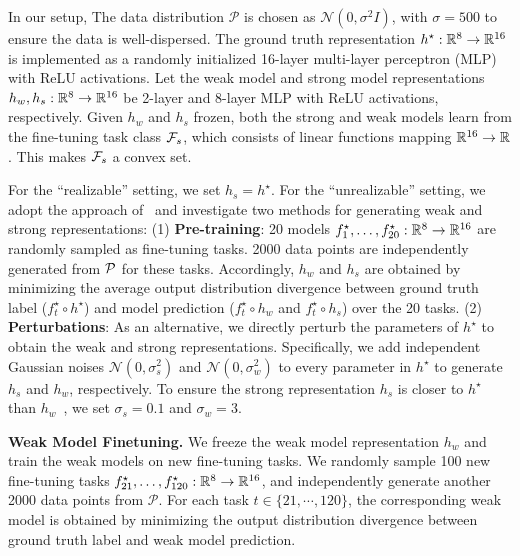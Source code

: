 In our setup, The data distribution $\mathcal{P}$ is chosen as $\mathcal{N}(0, \sigma^2 I)$, with $\sigma=500$ to ensure the data is well-dispersed.
The ground truth representation $h^\star:\mathbb{R}^8 \to \mathbb{R}^{16}$ is implemented as a randomly initialized 16-layer multi-layer perceptron (MLP) with ReLU activations.
Let the weak model and strong model representations $h_w, h_s: \mathbb{R}^8 \to \mathbb{R}^{16}$ be 2-layer and 8-layer MLP with ReLU activations, respectively.
Given $h_w$ and $h_s$ frozen, both the strong and weak models learn from the fine-tuning task class $\mathcal{F}_s$, which consists of linear functions mapping $\mathbb{R}^{16}\to\mathbb{R}$.
This makes $\mathcal{F}_s$ a convex set. 

For the ``realizable'' setting, we set $h_s = h^\star$.
For the ``unrealizable'' setting, we adopt the approach of~\citet{charikar2024quantifying} and investigate two methods for generating weak and strong representations: (1) \textbf{Pre-training}: 20 models $f_1^\star,\dots,f_{20}^\star: \mathbb{R}^8 \to \mathbb{R}^{16}$ are randomly sampled as fine-tuning tasks. 2000 data points are independently generated from $\mathcal{P}$ for these tasks. Accordingly, $h_w$ and $h_s$ are obtained by minimizing the average output distribution divergence between ground truth label ($f_t^\star \circ h^\star$) and model prediction ($f_t^\star \circ h_w$ and $f_t^\star \circ h_s$) over the 20 tasks.
(2) \textbf{Perturbations}: As an alternative, we directly perturb the parameters of $h^\star$ to obtain the weak and strong representations. 
Specifically, we add independent Gaussian noises $\mathcal{N}(0, \sigma_s^2)$ and $\mathcal{N}(0, \sigma_w^2)$ to every parameter in $h^\star$ to generate $h_s$ and $h_w$, respectively.
To ensure the strong representation $h_s$ is closer to $h^\star$ than $h_w$~\citep{charikar2024quantifying}, we set $\sigma_s=0.1$ and $\sigma_w=3$.



\noindent \textbf{Weak Model Finetuning.} 
We freeze the weak model representation $h_w$ and train the weak models on new fine-tuning tasks.
We randomly sample 100 new fine-tuning tasks $f_{21}^\star,\dots,f_{120}^\star: \mathbb{R}^8 \to \mathbb{R}^{16}$, and independently generate another 2000 data points from $\mathcal{P}$. 
For each task $t \in \{ 21, \cdots, 120 \}$, the corresponding weak model is obtained by minimizing the output distribution divergence between ground truth label and weak model prediction.

